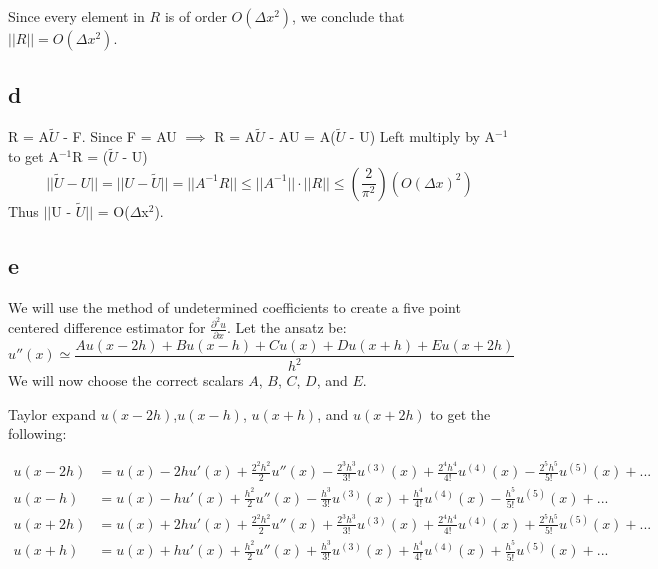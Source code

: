 \documentclass[11pt]{amsart}
\begin{document}
Since every element in $R$ is of order $O(\Delta x^2)$, we conclude that $||R|| = O(\Delta x^2)$.

\subsection*{d}
R = A$\tilde{U}$ - F. Since F = AU $\implies$ R = A$\tilde{U}$ - AU = A($\tilde{U}$ - U)
\newline
Left multiply by A$^{-1}$ to get A$^{-1}$R = ($\tilde{U}$ - U)
\[
||\tilde{U} - U|| = || U - \tilde{U}|| = ||A^{-1}R|| \le ||A^{-1}||\cdot||R|| \le (\frac{2}{\pi^2})(O(\Delta x)^2)
\]
Thus $||$U - $\tilde{U}$$||$ = O($\Delta$x$^{2}$).

\subsection*{e}
We will use the method of undetermined coefficients to create a five point centered difference estimator for $\frac{\partial ^2 u}{\partial x}$. Let the ansatz be:
\[
u''(x) \simeq \frac{Au(x-2h) + Bu(x-h) + Cu(x) + Du(x+h) + Eu(x+2h)}{h^2}
\]
We will now choose the correct scalars $A$, $B$, $C$, $D$, and $E$.

Taylor expand $u(x-2h)$,$ u(x-h)$, $u(x+h)$, and $u(x+2h)$ to get the following:

\begin{align*}
u(x - 2h) &= u(x) - 2hu'(x) + \frac{2^2h^2}{2} u''(x) - \frac{2^3h^3}{3!}u^{(3)}(x) + \frac{2^4h^4}{4!}u^{(4)}(x)-\frac{2^5h^5}{5!}u^{(5)}(x)+...\\
u(x - h) &= u(x) - hu'(x) + \frac{h^2}{2} u''(x) - \frac{h^3}{3!}u^{(3)}(x) + \frac{h^4}{4!}u^{(4)}(x)-\frac{h^5}{5!}u^{(5)}(x)+...\\
u(x + 2h) &= u(x) + 2hu'(x) + \frac{2^2h^2}{2} u''(x) + \frac{2^3h^3}{3!}u^{(3)}(x) + \frac{2^4h^4}{4!}u^{(4)}(x)+\frac{2^5h^5}{5!}u^{(5)}(x)+...\\
u(x + h) &= u(x) + hu'(x) + \frac{h^2}{2} u''(x) + \frac{h^3}{3!}u^{(3)}(x) + \frac{h^4}{4!}u^{(4)}(x)+\frac{h^5}{5!}u^{(5)}(x)+...\\
\end{align*}
\end{document}
